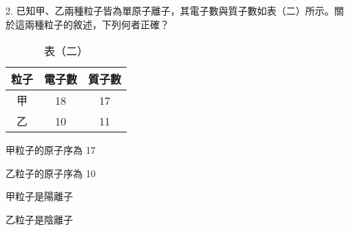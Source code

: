 \documentclass[12pt]{article}
\begin{document}
\begin{problem}
  \item[2.] 已知甲、乙兩種粒子皆為單原子離子，其電子數與質子數如表（二）所示。關於這兩種粒子的敘述，下列何者正確？
  \begin{table}[ht]
    \centering
    \renewcommand{\arraystretch}{1.2}
    \vspace*{-1ex}
    \caption*{表（二）}
    \vspace*{-1ex}
    \begin{tabular}{|c|c|c|}
      \hline
      粒子 & 電子數 & 質子數 \\ \hline
      甲 & 18 & 17 \\ \hline
      乙 & 10 & 11 \\ \hline
    \end{tabular}
  \end{table}
  \begin{choices}
    \item 甲粒子的原子序為 17
    \item 乙粒子的原子序為 10
    \item 甲粒子是陽離子
    \item 乙粒子是陰離子
  \end{choices}
\end{problem}
\end{document}
